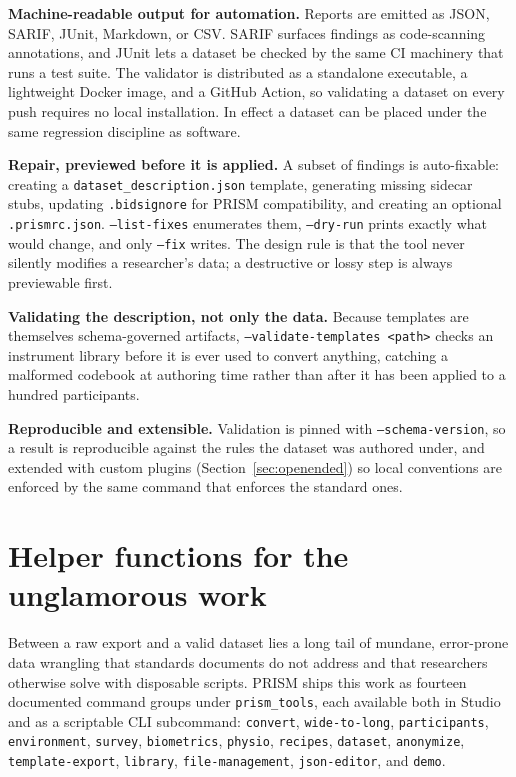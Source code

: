 \documentclass[10pt]{article}
\begin{document}
\textbf{Machine-readable output for automation.} Reports are emitted as
JSON, SARIF, JUnit, Markdown, or CSV. SARIF surfaces findings as code-scanning
annotations, and JUnit lets a dataset be checked by the same CI machinery
that runs a test suite. The validator is distributed as a standalone
executable, a lightweight Docker image, and a GitHub Action, so validating a
dataset on every push requires no local installation. In effect a dataset
can be placed under the same regression discipline as software.

\textbf{Repair, previewed before it is applied.} A subset of findings is
auto-fixable: creating a \texttt{dataset\_description.json} template,
generating missing sidecar stubs, updating \texttt{.bidsignore} for PRISM
compatibility, and creating an optional \texttt{.prismrc.json}.
\texttt{--list-fixes} enumerates them, \texttt{--dry-run} prints exactly
what would change, and only \texttt{--fix} writes. The design rule is that
the tool never silently modifies a researcher's data; a destructive or
lossy step is always previewable first.

\textbf{Validating the description, not only the data.} Because templates
are themselves schema-governed artifacts,
\texttt{--validate-templates <path>} checks an instrument library before it
is ever used to convert anything, catching a malformed codebook at
authoring time rather than after it has been applied to a hundred
participants.

\textbf{Reproducible and extensible.} Validation is pinned with
\texttt{--schema-version}, so a result is reproducible against the rules the
dataset was authored under, and extended with custom plugins
(Section~\ref{sec:openended}) so local conventions are enforced by the same
command that enforces the standard ones.

\section{Helper functions for the unglamorous work}
\label{sec:helpers}

Between a raw export and a valid dataset lies a long tail of mundane,
error-prone data wrangling that standards documents do not address and that
researchers otherwise solve with disposable scripts. PRISM ships this work
as fourteen documented command groups under \texttt{prism\_tools}, each
available both in Studio and as a scriptable CLI subcommand:
\texttt{convert}, \texttt{wide-to-long}, \texttt{participants},
\texttt{environment}, \texttt{survey}, \texttt{biometrics},
\texttt{physio}, \texttt{recipes}, \texttt{dataset}, \texttt{anonymize},
\texttt{template-export}, \texttt{library}, \texttt{file-management},
\texttt{json-editor}, and \texttt{demo}.
\end{document}
